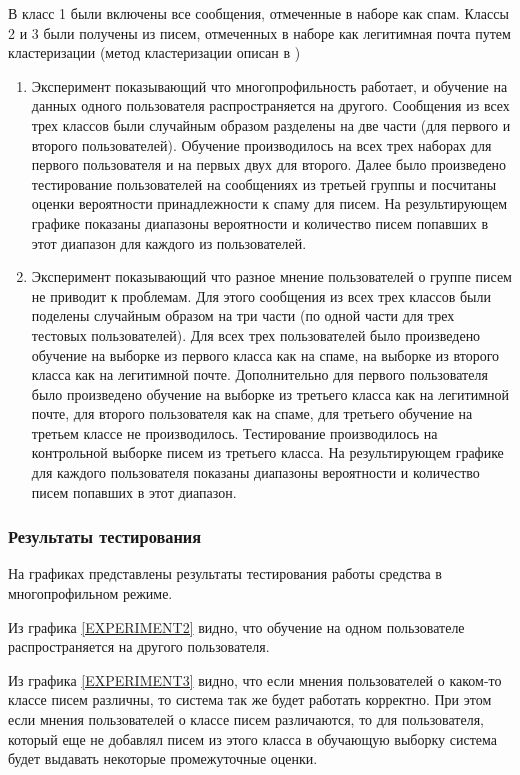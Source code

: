 В класс 1 были включены все сообщения, отмеченные в наборе \cite{SAPC} как спам. Классы 2 и 3 были получены из писем, отмеченных в наборе \cite{SAPC} как легитимная почта путем кластеризации (метод кластеризации описан в \cite{ROZ})
\begin{enumerate}
	\item Эксперимент показывающий что многопрофильность работает, и обучение на данных одного пользователя распространяется на другого. Сообщения из всех трех классов были случайным образом разделены на две части (для первого и второго пользователей). Обучение производилось на всех трех наборах для первого пользователя и на первых двух для второго. Далее было произведено тестирование пользователей на сообщениях из третьей группы и посчитаны оценки вероятности принадлежности к спаму для писем. На результирующем графике показаны диапазоны вероятности и количество писем попавших в этот диапазон для каждого из пользователей.

	\item Эксперимент показывающий что разное мнение пользователей о группе писем не приводит к проблемам. Для этого сообщения из всех трех классов были поделены случайным образом на три части (по одной части для трех тестовых пользователей). Для всех трех пользователей было произведено обучение на выборке из первого класса как на спаме, на выборке из второго класса как на легитимной почте. Дополнительно для первого пользователя было произведено обучение на выборке из третьего класса как на легитимной почте, для второго пользователя как на спаме, для третьего обучение на третьем классе не производилось. Тестирование производилось на контрольной выборке писем из третьего класса. На результирующем графике для каждого пользователя показаны диапазоны вероятности и количество писем попавших в этот диапазон.
	
\end{enumerate}
\subsubsection{Результаты тестирования}
На графиках представлены результаты тестирования работы средства в многопрофильном режиме. 

Из графика \ref{EXPERIMENT2} видно, что обучение на одном пользователе распространяется на другого пользователя.

Из графика \ref{EXPERIMENT3} видно, что если мнения пользователей о каком-то классе писем различны, то система так же будет работать корректно. При этом если мнения пользователей о классе писем различаются, то для пользователя, который еще не добавлял писем из этого класса в обучающую выборку система будет выдавать некоторые промежуточные оценки.

